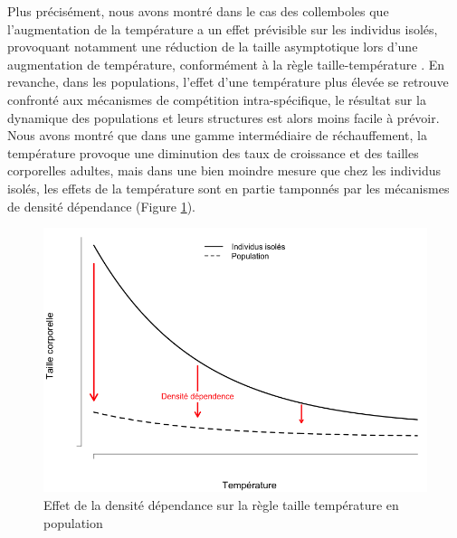 Plus précisément, nous avons montré dans le cas des collemboles que
l'augmentation de la température a un effet prévisible sur les individus isolés,
provoquant notamment une réduction de la taille asymptotique lors d'une
augmentation de température, conformément à la règle taille-température
\autocites{angilletta2009a}. En revanche, dans les populations, l'effet d'une
température plus élevée se retrouve confronté aux mécanismes de compétition
intra-spécifique, le résultat sur la dynamique des populations et leurs
structures est alors moins facile à prévoir. Nous avons montré que dans une
gamme intermédiaire de réchauffement, la température provoque une diminution des taux
de croissance et des tailles corporelles adultes, mais dans une bien moindre
mesure que chez les individus isolés, les effets de la température sont en
partie tamponnés par les mécanismes de densité dépendance (Figure
\ref{fig:Concl1}).

\begin{figure}[!ht]
\begin{center}
\includegraphics[width=1\textwidth]{Conclu/TempSizeRule}
\caption[Règle Taille-Température en
population]{Effet de la densité dépendance sur la règle taille température en
population}
\label{fig:Concl1}
\end{center}
\end{figure}


